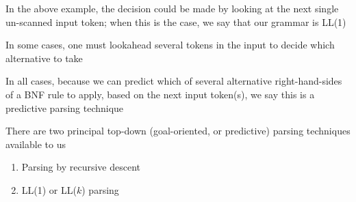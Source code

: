 \documentclass[8pt,a4paper,compress]{beamer}
\begin{document}
\begin{frame}[fragile]
\pause

In the above example, the decision could be made by looking at the next single un-scanned input token; when this is the case, we say that our grammar is LL(1)

\pause
\bigskip

In some cases, one must lookahead several tokens in the input to decide which alternative to take

\pause
\bigskip

In all cases, because we can predict which of several alternative right-hand-sides of a BNF rule to apply, based on the next input token(s), we say this is a predictive parsing technique

\pause
\bigskip

There are two principal top-down (goal-oriented, or predictive) parsing techniques available to us
\begin{enumerate}
\item Parsing by recursive descent
\item LL(1) or LL($k$) parsing
\end{enumerate}
\end{frame}
\end{document}
